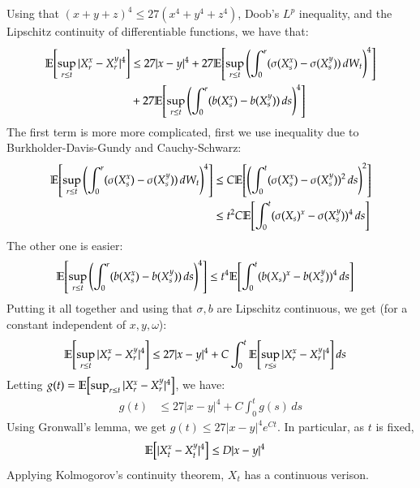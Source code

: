\documentclass[12pt]{article}
\theoremstyle{definitionstyle}
\newcommand{\1}{\mathds 1}
\newcommand{\E}{\mathbb E \qty}
\begin{document}
    Using that $(x+y+z)^4 \leq 27(x^4+y^4+z^4)$, Doob's $L^p$ inequality, and the Lipschitz continuity of differentiable functions, we have that:
    \begin{align*}
        \E[\sup_{r \leq t} |X_r^x - X_r^y|^4] &\leq 27|x-y|^4 + 27\E[\sup_{r \leq t} \qty(\int_0^r (\sigma(X_s^x) - \sigma(X_s^y)) \, dW_t)^4] 
        \\ &+ 27\E[\sup_{r \leq t} \qty(\int_0^r (b(X_s^x) - b(X_s^y)) \, ds)^4]
    \end{align*}
    The first term is more more complicated, first we use inequality due to Burkholder-Davis-Gundy and Cauchy-Schwarz:
    \begin{align*}
        \E[\sup_{r \leq t} \qty(\int_0^r (\sigma(X_s^x) - \sigma(X_s^y)) \, dW_t)^4] &\leq C\E[\qty(\int_0^t (\sigma(X_s^x) - \sigma(X_s^y))^2 \, ds)^2] 
        \\& \leq t^2 C \E[\int_0^t (\sigma(X_s)^x - \sigma(X_s^y))^4 \, ds]
    \end{align*}
    The other one is easier:
    \begin{align*}
        \E[\sup_{r \leq t} \qty(\int_0^r (b(X_s^x) - b(X_s^y)) \, ds)^4] &\leq t^4\E[\int_0^t (b(X_s)^x - b(X_s^y))^4 \, ds]
    \end{align*}
    Putting it all together and using that $\sigma, b$ are Lipschitz continuous, we get (for a constant independent of $x,y,\omega$):
    \begin{align*}
        \E[\sup_{r \leq t} |X_r^x - X_r^y|^4] &\leq 27|x-y|^4 + C \int_0^t \E[\sup_{r \leq s} |X_r^x - X_r^y|^4] \, ds
    \end{align*}
    Letting $g(t) = \E[\sup_{r \leq t} |X_r^x - X_r^y|^4]$, we have:
    \begin{align*}
        g(t) &\leq 27|x-y|^4 + C\int_0^t g(s) \, ds
    \end{align*}
    Using Gronwall's lemma, we get $g(t) \leq 27|x-y|^4 e^{Ct}$. In particular, as $t$ is fixed,
    \begin{align*}
        \E[|X_t^x - X_t^y|^4] &\leq D |x-y|^4
    \end{align*}
    Applying Kolmogorov's continuity theorem, $X_t$ has a continuous verison.
    
\end{document}
